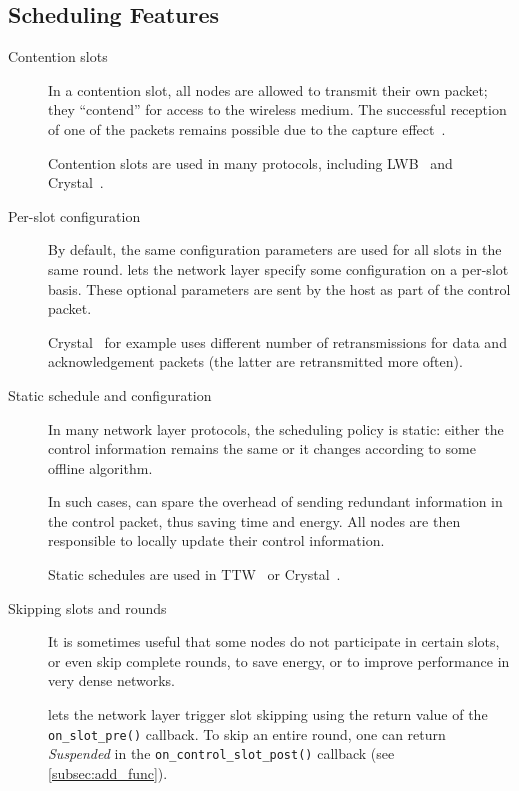 \subsection{Scheduling Features}

\label{subsec:adv_sched}

\begin{description}

	\item[Contention slots]
	In a contention slot, all nodes are allowed to transmit their own packet; they ``contend'' for access to the wireless medium. The successful reception of one of the packets remains possible due to the capture effect~\cite{yuan2013LetTalkTogether}.

	Contention slots are used in many protocols, including LWB~\cite{ferrari2012LWB} and Crystal~\cite{istomin2018Interferenceresilient}.

	\item [Per-slot configuration]
	By default, the same configuration parameters are used for all slots in the same round. \baloo lets the network layer specify some configuration on a per-slot basis. These optional parameters are sent by the host as part of the control packet.

	Crystal~\cite{istomin2018Interferenceresilient} for example uses different number of retransmissions for data and acknowledgement packets (the latter are retransmitted more often).

	\item [Static schedule and configuration]
	In many network layer protocols, the scheduling policy is static: either the control information remains the same or it changes according to some offline algorithm.

	In such cases, \baloo can spare the overhead of sending redundant information in the control packet, thus saving time and energy. All nodes are then responsible to locally update their control information.

	Static schedules are used \eg in TTW~\cite{jacob2017TTW_extended} or Crystal~\cite{istomin2018Interferenceresilient}.

	\item [Skipping slots and rounds]
	It is sometimes useful that some nodes do not participate in certain slots, or even skip complete rounds, \eg to save energy, or to improve performance in very dense networks.

	\baloo lets the network layer trigger slot skipping using the return value of the \texttt{on\_slot\_pre()} callback.
	To skip an entire round, one can return \textsl{Suspended} in the \texttt{on\_control\_slot\_post()} callback (see \cref{subsec:add_func}).


\end{description}

